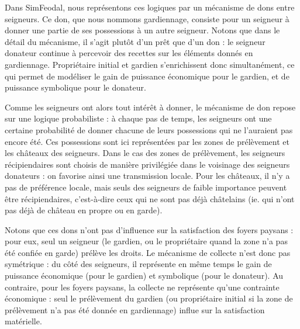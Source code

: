 \begin{tcolorbox}[breakable,left=0pt,right=0pt,top=0pt,bottom=0pt,
	colback=gray!15,colframe=gray!15,width=\dimexpr\textwidth\relax, 
	enlarge left by=0mm, boxsep=5pt,arc=0pt,outer arc=0pt]
	
	Dans SimFeodal, nous représentons ces logiques par un mécanisme de dons entre seigneurs.
	Ce don, que nous nommons \og gardiennage\fg{}, consiste pour un seigneur à donner une partie de ses possessions à un autre seigneur.
	Notons que dans le détail du mécanisme, il s'agit plutôt d'un prêt que d'un don : le seigneur donateur continue à percevoir des recettes sur les éléments donnés en gardiennage\footnotemark.
	Propriétaire initial et gardien s'enrichissent donc simultanément, ce qui permet de modéliser le gain de puissance économique pour le gardien, et de puissance symbolique pour le donateur.
	
	Comme les seigneurs ont alors tout intérêt à donner, le mécanisme de don repose sur une logique probabiliste : à chaque pas de temps, les seigneurs ont une certaine probabilité de donner chacune de leurs possessions qui ne l'auraient pas encore été.
	Ces possessions sont ici représentées par les zones de prélèvement et les châteaux des seigneurs.
	Dans le cas des zones de prélèvement, les seigneurs récipiendaires sont choisis de manière privilégiée dans le voisinage des seigneurs donateurs : on favorise ainsi une transmission locale.
	Pour les châteaux, il n'y a pas de préférence locale, mais seuls des seigneurs de faible importance peuvent être récipiendaires, c'est-à-dire ceux qui ne sont pas déjà châtelains (ie. qui n'ont pas déjà de château en propre ou en garde).
	
	Notons que ces dons n'ont pas d'influence sur la satisfaction des foyers paysans : pour eux, seul un seigneur (le gardien, ou le propriétaire quand la zone n'a pas été confiée en garde) prélève les droits.
	Le mécanisme de collecte n'est donc pas symétrique : du côté des seigneurs, il représente en même temps le gain de puissance économique (pour le gardien) et symbolique (pour le donateur).
	Au contraire, pour les foyers paysans, la collecte ne représente qu'une contrainte économique : seul le prélèvement du gardien (ou propriétaire initial si la zone de prélèvement n'a pas été donnée en gardiennage) influe sur la satisfaction matérielle.
\end{tcolorbox}

